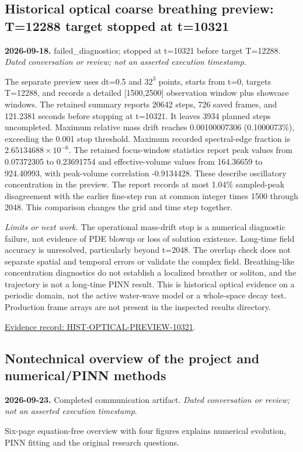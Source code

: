 \documentclass[11pt]{article}
\begin{document}
\subsection*{Historical optical coarse breathing preview: T=12288 target stopped at t=10321}
\noindent\textbf{2026-09-18.} failed\_diagnostics; stopped at t=10321 before target T=12288. \emph{Dated conversation or review; not an asserted execution timestamp}.\par
The separate preview uses dt=0.5 and $32^3$ points, starts from t=0, targets T=12288, and records a detailed [1500,2500] observation window plus showcase windows. The retained summary reports 20642 steps, 726 saved frames, and 121.2381 seconds before stopping at t=10321. It leaves 3934 planned steps uncompleted. Maximum relative mass drift reaches 0.00100007306 (0.1000073\%), exceeding the 0.001 stop threshold. Maximum recorded spectral-edge fraction is $2.65134688\times 10^{-6}$. The retained focus-window statistics report peak values from 0.07372305 to 0.23691754 and effective-volume values from 164.36659 to 924.40993, with peak-volume correlation -0.9134428. These describe oscillatory concentration in the preview. The report records at most 1.04\% sampled-peak disagreement with the earlier fine-step run at common integer times 1500 through 2048. This comparison changes the grid and time step together.

\noindent\textit{Limits or next work.} The operational mass-drift stop is a numerical diagnostic failure, not evidence of PDE blowup or loss of solution existence. Long-time field accuracy is unresolved, particularly beyond t=2048. The overlap check does not separate spatial and temporal errors or validate the complex field. Breathing-like concentration diagnostics do not establish a localized breather or soliton, and the trajectory is not a long-time PINN result. This is historical optical evidence on a periodic domain, not the active water-wave model or a whole-space decay test. Production frame arrays are not present in the inspected results directory.

\noindent\href{https://github.com/matasvai/dysthe-paper/blob/codex/research-record-2026-11-05/research-record/2026-11-05/README.md#hist-optical-preview-10321}{Evidence record: HIST-OPTICAL-PREVIEW-10321}.
\subsection*{Nontechnical overview of the project and numerical/PINN methods}
\noindent\textbf{2026-09-23.} Completed communication artifact. \emph{Dated conversation or review; not an asserted execution timestamp}.\par
Six-page equation-free overview with four figures explains numerical evolution, PINN fitting and the original research questions.
\end{document}
